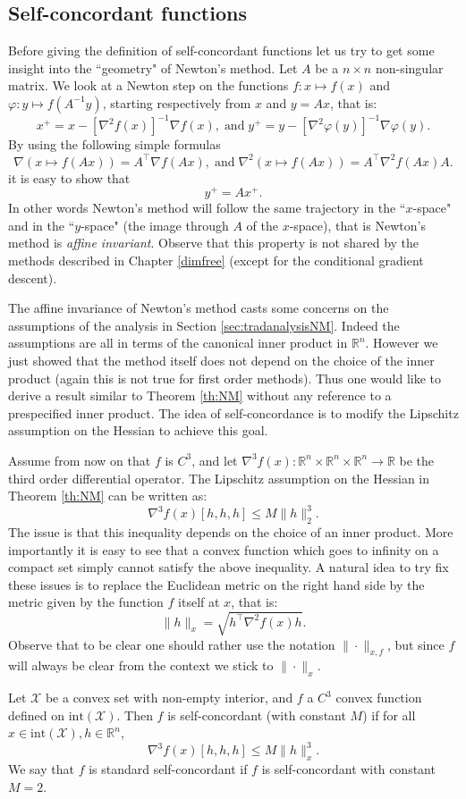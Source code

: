 \documentclass[openany]{now}
\newcommand{\inte}{\mathrm{int}}
\renewcommand{\phi}{\varphi}
\newcommand{\R}{\mathbb{R}}
\begin{document}
\subsection{Self-concordant functions}
Before giving the definition of self-concordant functions let us try to get some insight into the ``geometry" of Newton's method. Let $A$ be a $n \times n$ non-singular matrix. We look at a Newton step on the functions $f: x \mapsto f(x)$ and $\phi: y \mapsto f(A^{-1} y)$, starting respectively from $x$ and $y= A x$, that is:
$$x^+ = x  - [\nabla^2 f(x)]^{-1} \nabla f(x) , \; \text{and} \; y^+ = y  - [\nabla^2 \phi(y)]^{-1} \nabla \phi(y) .$$
By using the following simple formulas
$$\nabla (x \mapsto f(A x) ) =A^{\top} \nabla f(A x) , \; \text{and} \; \nabla^2 (x \mapsto f(A x) ) =A^{\top} \nabla^2 f(A x) A .$$
it is easy to show that
$$y^+ = A x^+ .$$
In other words Newton's method will follow the same trajectory in the ``$x$-space" and in the ``$y$-space" (the image through $A$ of the $x$-space), that is Newton's method is {\em affine invariant}. Observe that this property is not shared by the methods described in Chapter \ref{dimfree} (except for the conditional gradient descent).

The affine invariance of Newton's method casts some concerns on the assumptions of the analysis in Section \ref{sec:tradanalysisNM}. Indeed the assumptions are all in terms of the canonical inner product in $\R^n$. However we just showed that the method itself does not depend on the choice of the inner product (again this is not true for first order methods). Thus one would like to derive a result similar to Theorem \ref{th:NM} without any reference to a prespecified inner product. The idea of self-concordance is to modify the Lipschitz assumption on the Hessian to achieve this goal.

Assume from now on that $f$ is $C^3$, and let $\nabla^3 f(x) : \R^n \times \R^n \times \R^n \rightarrow \R$ be the third order differential operator. The Lipschitz assumption on the Hessian in Theorem \ref{th:NM} can be written as:
$$\nabla^3 f(x) [h,h,h] \leq M \|h\|_2^3 .$$
The issue is that this inequality depends on the choice of an inner product. More importantly it is easy to see that a convex function which goes to infinity on a compact set simply cannot satisfy the above inequality. A natural idea to try fix these issues is to replace the Euclidean metric on the right hand side by the metric given by the function $f$ itself at $x$, that is:
$$\|h\|_x = \sqrt{ h^{\top} \nabla^2 f(x) h }.$$
Observe that to be clear one should rather use the notation $\|\cdot\|_{x, f}$, but since $f$ will always be clear from the context we stick to $\|\cdot\|_x$.
\begin{definition}
Let $\mathcal{X}$ be a convex set with non-empty interior, and $f$ a $C^3$ convex function defined on $\inte(\mathcal{X})$. Then $f$ is self-concordant (with constant $M$) if for all $x \in \inte(\mathcal{X}), h \in \R^n$,
$$\nabla^3 f(x) [h,h,h] \leq M \|h\|_x^3 .$$
We say that $f$ is standard self-concordant if $f$ is self-concordant with constant $M=2$.
\end{definition}
\end{document}
